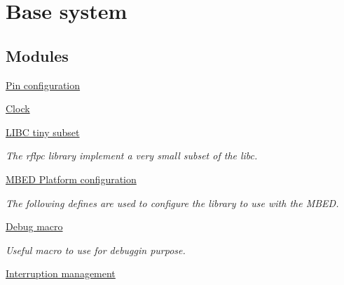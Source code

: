\hypertarget{group__system}{\section{Base system}
\label{group__system}
}
\subsection*{Modules}
\begin{DoxyCompactItemize}
\item 
\hyperlink{group__pinconf}{Pin configuration}
\item 
\hyperlink{group__clock}{Clock}
\item 
\hyperlink{group__libc}{L\-I\-B\-C tiny subset}
\begin{DoxyCompactList}\small\item\em The rflpc library implement a very small subset of the libc. \end{DoxyCompactList}\item 
\hyperlink{group__config}{M\-B\-E\-D Platform configuration}
\begin{DoxyCompactList}\small\item\em The following defines are used to configure the library to use with the M\-B\-E\-D. \end{DoxyCompactList}\item 
\hyperlink{group__debug}{Debug macro}
\begin{DoxyCompactList}\small\item\em Useful macro to use for debuggin purpose. \end{DoxyCompactList}\item 
\hyperlink{group__irq}{Interruption management}
\end{DoxyCompactItemize}
